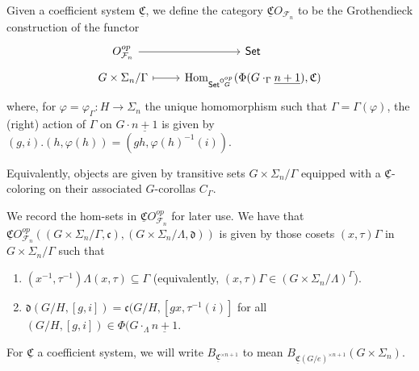 \documentclass[a4paper,10pt
,draft
]{article}%
\renewcommand{\phi}{\varphi}
\newcommand{\UC}{\underline{\mathfrak C}}
\renewcommand{\F}{\mathcal F}
\renewcommand{\1}{\ensuremath{\mathbb{id}}}
\begin{document}

\begin{definition}
      Given a coefficient system $\UC$, we define the category $\UC O_{\F_n}$ to be the Grothendieck construction of the functor
      \begin{equation}
            \begin{tikzcd}[row sep = tiny]
                  O_{\F_n}^{op} \arrow[r]
                  &
                  \Set
                  \\
                  G \times \Sigma_n / \Gamma \arrow[r, mapsto]
                  &
                  \Hom_{\Set^{\mathsf O_G^{op}}}(\Phi(G \cdot_\Gamma \underline{n+1}), \mathfrak C)
            \end{tikzcd}
      \end{equation}
      where, for $\phi = \phi_\Gamma: H \to \Sigma_n$ the unique homomorphism such that $\Gamma = \Gamma(\phi)$,
      the (right) action of $\Gamma$ on $G \cdot \underline{n+1}$ is given by
      $(g,i).(h,\phi(h)) = (gh, \phi(h)^{-1}(i))$.
\end{definition}

Equivalently, objects are given by transitive sets $G \times \Sigma_n / \Gamma$
equipped with a $\UC$-coloring on their associated $G$-corollas $C_\Gamma$.

\begin{remark}
      We record the hom-sets in $\UC O_{\F_n}^{op}$ for later use. We have that
      \mbox{$\UC O_{\F_n}^{op}((G \times \Sigma_n/\Gamma, \mathfrak c), (G \times \Sigma_n / \Lambda, \mathfrak d))$}
      is given by those cosets $(x,\tau)\Gamma$ in $G \times \Sigma_n / \Gamma$ such that
      \begin{enumerate}
      \item $(x^{-1},\tau^{-1})\Lambda(x,\tau) \subseteq \Gamma$
            (equivalently, $(x,\tau)\Gamma \in (G \times \Sigma_n/\Lambda)^\Gamma$).
      \item $\mathfrak d(G/H, [g,i]) = \mathfrak c(G/H, [g x, \tau^{-1}(i)]$
            for all $(G/H, [g,i]) \in \Phi(G \cdot_{\Lambda} \underline{n+1}$.
      \end{enumerate}
\end{remark}

\begin{notation}
      For $\UC$ a coefficient system, we will write $B_{\UC^{\times n+1}}$ to mean
      $B_{\UC(G/e)^{\times n+1}}(G \times \Sigma_n)$.
\end{notation}
\end{document}
